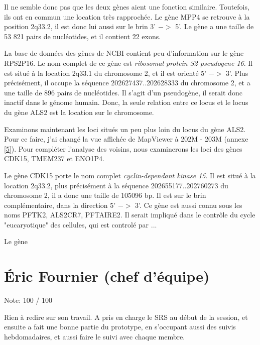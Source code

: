 \documentclass[11pt]{article} %
\begin{document}
Il ne semble donc pas que les deux gènes aient une fonction similaire. Toutefois, ils ont en commun une location très 
rapprochée. Le gène MPP4 se retrouve à la position 2q33.2, il est donc lui aussi sur le brin 3' $->$ 5'. Le gène a une 
taille de 53 821 pairs de nucléotides, et il contient 22 exons. 

La base de données des gènes de NCBI contient peu d'information sur le gène RPS2P16. Le nom complet de ce gène est
\emph{ribosomal protein S2 pseudogene 16}. Il est situé à la location 2q33.1 du chromosome 2, et il est orienté
5' $->$ 3'. Plus précisément, il occupe la séquence 202627437..202628333 du chromosome 2, et a une taille de 896 pairs de 
nucléotides. Il s'agit d'un pseudogène, il serait donc inactif dans le génome humain. Donc, la seule relation entre ce locus
et le locus du gène ALS2 est la location sur le chromosome.

Examinons maintenant les loci situés un peu plus loin du locus du gène ALS2. Pour ce faire, j'ai changé la vue affichée de
MapViewer à 202M - 203M (annexe \ref{5}). Pour compléter l'analyse des voisins, nous examinerons les loci des gènes CDK15,
TMEM237 et ENO1P4.

Le gène CDK15 porte le nom complet \emph{cyclin-dependant kinase 15}. Il est situé à la location 2q33.2, plus précisément
à la séquence 202655177..202760273 du chromosome 2, il a donc une taille de 105096 bp. Il est sur le brin complémentaire, dans la direction 5' $->$ 3'. Ce gène est aussi connu sous les noms PFTK2, ALS2CR7, PFTAIRE2. Il serait impliqué dans le contrôle du cycle "eucaryotique" des cellules, qui est controlé par ...

Le gène 




 
\section{Éric Fournier (chef d'équipe)}

{\LARGE Note: 100 / 100}
 
Rien à redire sur son travail. A pris en charge le SRS au début de la session, et ensuite a
fait une bonne partie du prototype, en s'occupant aussi des suivis hebdomadaires, et aussi
faire le suivi avec chaque membre.
 
\end{document}
